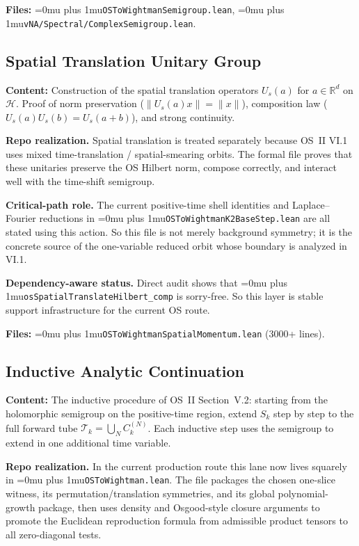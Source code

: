 \documentclass[11pt,a4paper]{article}
\newcommand{\leanfile}[1]{\begingroup\Urlmuskip=0mu plus 1mu\relax\nolinkurl{#1}\endgroup}
\newcommand{\leanname}[1]{\begingroup\Urlmuskip=0mu plus 1mu\relax\nolinkurl{#1}\endgroup}
\begin{document}
\textbf{Files:} \leanname{OSToWightmanSemigroup.lean},
\leanname{vNA/Spectral/ComplexSemigroup.lean}.

\subsection{Spatial Translation Unitary Group}

\textbf{Content:} Construction of the spatial translation operators
$U_s(a)$ for $a \in \mathbb{R}^d$ on $\mathscr{H}$. Proof of
norm preservation ($\|U_s(a)x\| = \|x\|$), composition law
($U_s(a) U_s(b) = U_s(a+b)$), and strong continuity.

\medskip\noindent
\textbf{Repo realization.}
Spatial translation is treated separately because OS~II VI.1 uses mixed
time-translation / spatial-smearing orbits. The formal file proves that these
unitaries preserve the OS Hilbert norm, compose correctly, and interact
well with the time-shift semigroup.

\medskip\noindent
\textbf{Critical-path role.}
The current positive-time shell identities and Laplace--Fourier reductions in
\leanfile{OSToWightmanK2BaseStep.lean} are all stated using this action. So this
file is not merely background symmetry; it is the concrete source of the
one-variable reduced orbit whose boundary is analyzed in VI.1.

\medskip\noindent
\textbf{Dependency-aware status.}
Direct audit shows that \leanname{osSpatialTranslateHilbert\_comp} is sorry-free.
So this layer is stable support infrastructure for the current OS route.

\textbf{Files:} \leanname{OSToWightmanSpatialMomentum.lean} (3000+ lines).

\subsection{Inductive Analytic Continuation}

\textbf{Content:} The inductive procedure of OS~II Section~V.2:
starting from the holomorphic semigroup on the positive-time region,
extend $S_k$ step by step to the full forward tube
$\mathscr{T}_k = \bigcup_N C_k^{(N)}$. Each inductive step uses
the semigroup to extend in one additional time variable.

\medskip\noindent
\textbf{Repo realization.}
In the current production route this lane now lives squarely in
\leanfile{OSToWightman.lean}. The file packages the chosen one-slice witness,
its permutation/translation symmetries, and its global polynomial-growth
package, then uses density and Osgood-style closure arguments to promote the
Euclidean reproduction formula from admissible product tensors to all
zero-diagonal tests.
\end{document}
